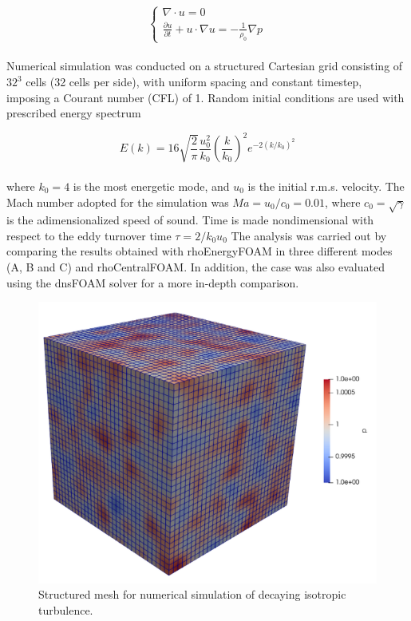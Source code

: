 \documentclass[a5paper]{sapthesis}
\begin{document}
	\begin{equation}
		\begin{cases}
			\nabla \cdot u = 0 \\
			\frac{\partial u}{\partial t} + u \cdot \nabla u = - \frac{1}{\rho_0} \nabla p
		\end{cases}
	\end{equation}
	\\
	Numerical simulation was conducted on a structured Cartesian grid consisting of $32^3$ cells (32 cells per side), with uniform spacing and constant timestep, imposing a Courant number (CFL) of 1. Random initial conditions are used with prescribed energy spectrum
	
	\begin{equation}
		E(k) = 16 \sqrt{\frac{2}{\pi}} \frac{u_0^2}{k_0} \left( \frac{k}{k_0} \right )^2 e^{-2(k/k_0)^2}
	\end{equation}
	\\
	where $k_0 = 4$ is the most energetic mode, and $u_0$ is the initial r.m.s. velocity. The Mach number adopted for the simulation was $ Ma= u_0/c_0= 0.01$, where $c_0 = \sqrt{\gamma}$ is the adimensionalized speed of sound. Time is made nondimensional with respect to the eddy turnover time $\tau = 2/k_0 u_0$
	The analysis was carried out by comparing the results obtained with rhoEnergyFOAM in three different modes (A, B and C) and rhoCentralFOAM. In addition, the case was also evaluated using the dnsFOAM solver for a more in-depth comparison.
	
	\begin{figure}
		\centering
		\hspace{20mm}
		\includegraphics[width=0.7\linewidth]{Figures/DIT}
		\caption{Structured mesh for numerical simulation of decaying isotropic turbulence.}
		\label{DIT_mesh}
	\end{figure}
	
\end{document}
